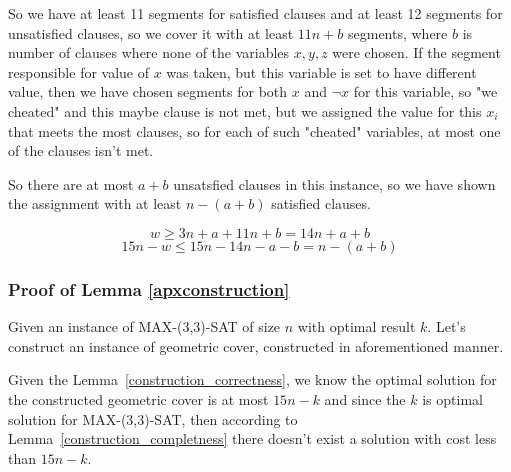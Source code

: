 So we have at least 11 segments for satisfied clauses
and at least 12 segments
for unsatisfied clauses, so we cover it with 
at least $11n + b$ segments, where $b$ is number of clauses
where none of the variables $x, y, z$ were chosen.
If the segment responsible for value of $x$ was taken,
but this variable is set to have different value,
then we have chosen segments for both $x$ and $\neg x$ for this variable,
so "we cheated" and this maybe clause is not met,
but we assigned the value for this $x_i$ that meets
the most clauses, so for each of such "cheated" variables,
at most one of the clauses isn't met.

So there are at most $a+b$ unsatsfied clauses in this instance,
so we have shown the assignment with at least  $n-(a+b)$ satisfied clauses.

$$w \ge 3n + a + 11n + b = 14n + a + b$$
$$15n - w  \le 15n - 14 n - a - b = n - (a+b)$$

\subsubsection{Proof of Lemma \ref{apxconstruction}}
Given an instance of MAX-(3,3)-SAT of size $n$
with optimal result $k$.
Let's construct an instance of geometric cover,
constructed in aforementioned manner.

Given the Lemma~\ref{construction_correctness}, we know
the optimal solution for the constructed geometric cover is
at most $15n - k$ and since the $k$ is optimal solution
for MAX-(3,3)-SAT, then according to Lemma~\ref{construction_completness}
there doesn't exist a solution with cost less than $15n - k$.
